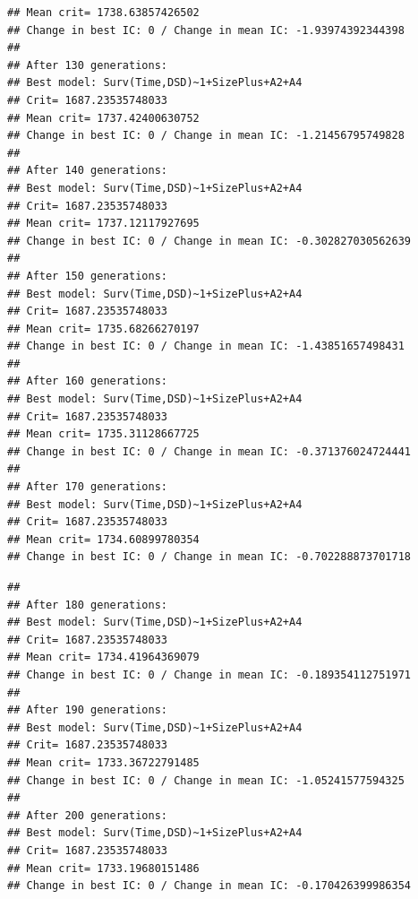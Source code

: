 \documentclass{article}\usepackage[]{graphicx}\usepackage[]{color}
\makeatletter
\newenvironment{kframe}{%
 \def\at@end@of@kframe{}%
 \ifinner\ifhmode%
  \def\at@end@of@kframe{\end{minipage}}%
  \begin{minipage}{\columnwidth}%
 \fi\fi%
 \def\FrameCommand##1{\hskip\@totalleftmargin \hskip-\fboxsep
 \colorbox{shadecolor}{##1}\hskip-\fboxsep
     \hskip-\linewidth \hskip-\@totalleftmargin \hskip\columnwidth}%
 \MakeFramed {\advance\hsize-\width
   \@totalleftmargin\z@ \linewidth\hsize
   \@setminipage}}%
 {\par\unskip\endMakeFramed%
 \at@end@of@kframe}
\newenvironment{knitrout}{}{} %
\makeatother
\begin{document}
\begin{knitrout}
\begin{kframe}
\begin{verbatim}
## Mean crit= 1738.63857426502
## Change in best IC: 0 / Change in mean IC: -1.93974392344398
## 
## After 130 generations:
## Best model: Surv(Time,DSD)~1+SizePlus+A2+A4
## Crit= 1687.23535748033
## Mean crit= 1737.42400630752
## Change in best IC: 0 / Change in mean IC: -1.21456795749828
## 
## After 140 generations:
## Best model: Surv(Time,DSD)~1+SizePlus+A2+A4
## Crit= 1687.23535748033
## Mean crit= 1737.12117927695
## Change in best IC: 0 / Change in mean IC: -0.302827030562639
## 
## After 150 generations:
## Best model: Surv(Time,DSD)~1+SizePlus+A2+A4
## Crit= 1687.23535748033
## Mean crit= 1735.68266270197
## Change in best IC: 0 / Change in mean IC: -1.43851657498431
## 
## After 160 generations:
## Best model: Surv(Time,DSD)~1+SizePlus+A2+A4
## Crit= 1687.23535748033
## Mean crit= 1735.31128667725
## Change in best IC: 0 / Change in mean IC: -0.371376024724441
## 
## After 170 generations:
## Best model: Surv(Time,DSD)~1+SizePlus+A2+A4
## Crit= 1687.23535748033
## Mean crit= 1734.60899780354
## Change in best IC: 0 / Change in mean IC: -0.702288873701718
\end{verbatim}


{\ttfamily\noindent\color{warningcolor}{\#\# Warning in fitter(X, Y, strats, offset, init, control, weights = weights, : Loglik converged before variable\ \ 4 ; beta may be infinite.}}\begin{verbatim}
## 
## After 180 generations:
## Best model: Surv(Time,DSD)~1+SizePlus+A2+A4
## Crit= 1687.23535748033
## Mean crit= 1734.41964369079
## Change in best IC: 0 / Change in mean IC: -0.189354112751971
## 
## After 190 generations:
## Best model: Surv(Time,DSD)~1+SizePlus+A2+A4
## Crit= 1687.23535748033
## Mean crit= 1733.36722791485
## Change in best IC: 0 / Change in mean IC: -1.05241577594325
## 
## After 200 generations:
## Best model: Surv(Time,DSD)~1+SizePlus+A2+A4
## Crit= 1687.23535748033
## Mean crit= 1733.19680151486
## Change in best IC: 0 / Change in mean IC: -0.170426399986354
\end{verbatim}



\end{kframe}
\end{knitrout}
\end{document}
